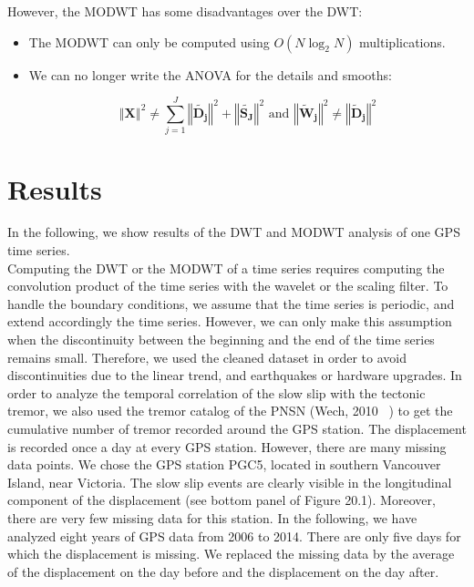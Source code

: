 \documentclass[main.tex]{subfiles}
\begin{document}
However, the MODWT has some disadvantages over the DWT:

\begin{itemize}
	\item The MODWT can only be computed using $O \left( N \log_2 N \right)$ multiplications.
	\item We can no longer write the ANOVA for the details and smooths:

\begin{equation}
\left\Vert \bm{X} \right\Vert ^2 \neq \sum_{j = 1}^{J} \left\Vert \bm{\widetilde{D_j}} \right\Vert ^2 + \left\Vert \bm{\widetilde{S_J}} \right\Vert ^2 \text{ and } \left\Vert \bm{\widetilde{W}_j} \right\Vert ^2 \neq \left\Vert \bm{\widetilde{D}_j} \right\Vert ^2
\end{equation}

\end{itemize}

\chapter{Results}

In the following, we show results of the DWT and MODWT analysis of one GPS time series. \\

Computing the DWT or the MODWT of a time series requires computing the convolution product of the time series with the wavelet or the scaling filter. To handle the boundary conditions, we assume that the time series is periodic, and extend accordingly the time series. However, we can only make this assumption when the discontinuity between the beginning and the end of the time series remains small. Therefore, we used the cleaned dataset in order to avoid discontinuities due to the linear trend, and earthquakes or hardware upgrades. In order to analyze the temporal correlation of the slow slip with the tectonic tremor, we also used the tremor catalog of the PNSN (Wech, 2010 ~\cite{WEC_2010}) to get the cumulative number of tremor recorded around the GPS station. The displacement is recorded once a day at every GPS station. However, there are many missing data points. We chose the GPS station PGC5, located in southern Vancouver Island, near Victoria. The slow slip events are clearly visible in the longitudinal component of the displacement (see bottom panel of Figure 20.1). Moreover, there are very few missing data for this station. In the following, we have analyzed eight years of GPS data from 2006 to 2014. There are only five days for which the displacement is missing. We replaced the missing data by the average of the displacement on the day before and the displacement on the day after. \\
\end{document}
